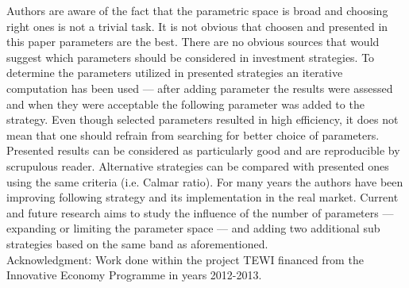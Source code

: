 \documentclass{tewiart}
\begin{document}
Authors are aware of the fact that the parametric space is broad and choosing right ones is not a trivial task. It is not obvious that choosen and presented in this paper parameters are the best. There are no obvious sources that would suggest which parameters should be considered in investment strategies. To determine the parameters utilized in presented strategies an iterative computation has been used --- after adding parameter the results were assessed and when they were acceptable the following parameter was added to the strategy. Even though selected parameters resulted in high efficiency, it does not mean that one should refrain from searching for better choice of parameters. Presented results can be considered as particularly good and are reproducible by scrupulous reader. Alternative strategies can be compared with presented ones using the same criteria (i.e. Calmar ratio). For many years the authors have been improving following strategy and its implementation in the real market. Current and future research aims to study the influence of the number of parameters --- expanding or limiting the parameter space --- and adding two additional sub strategies based on the same band as aforementioned.\\

\noindent Acknowledgment: Work done within the project TEWI financed from the Innovative Economy Programme in years 2012-2013.

 


\end{document}
